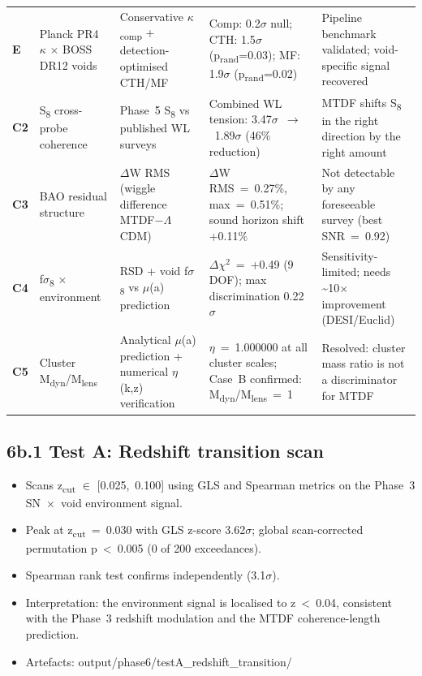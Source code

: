 \documentclass[11pt,a4paper]{article}
\begin{document}
\begin{table}[H]
\begin{tabularx}{\linewidth}{l>{\RaggedRight\arraybackslash}X>{\RaggedRight\arraybackslash}X>{\RaggedRight\arraybackslash}X>{\RaggedRight\arraybackslash}X}
\textbf{E} & Planck PR4 $\kappa$ $\times$ BOSS DR12 voids & Conservative $\kappa$\textsubscript{comp} + detection-optimised CTH/\allowbreak{}MF & Comp: 0.2$\sigma$ null; CTH: 1.5$\sigma$ (p\textsubscript{rand}=0.03); MF: 1.9$\sigma$ (p\textsubscript{rand}=0.02) & Pipeline benchmark validated; void-specific signal recovered \tabularnewline
\textbf{C2} & S\textsubscript{8} cross-probe coherence & Phase~5 S\textsubscript{8} vs published WL surveys & Combined WL tension: 3.47$\sigma$~$\rightarrow$~1.89$\sigma$ (46\% reduction) & MTDF shifts S\textsubscript{8} in the right direction by the right amount \tabularnewline
\textbf{C3} & BAO residual structure & $\Delta$W RMS (wiggle difference MTDF$-$$\Lambda$CDM) & $\Delta$W RMS~=~0.27\%, max~=~0.51\%; sound horizon shift +0.11\% & Not detectable by any foreseeable survey (best SNR~=~0.92) \tabularnewline
\textbf{C4} & f$\sigma$\textsubscript{8} $\times$ environment & RSD + void f$\sigma$\textsubscript{8} vs $\mu$(a) prediction & $\Delta$$\chi$$^{2}$~=~+0.49 (9 DOF); max discrimination 0.22$\sigma$ & Sensitivity-limited; needs \~{}10$\times$ improvement (DESI/\allowbreak{}Euclid) \tabularnewline
\textbf{C5} & Cluster M\textsubscript{dyn}/M\textsubscript{lens} & Analytical $\mu$(a) prediction + numerical $\eta$(k,z) verification & $\eta$~=~1.000000 at all cluster scales; Case~B confirmed: M\textsubscript{dyn}/M\textsubscript{lens}~=~1 & Resolved: cluster mass ratio is not a discriminator for MTDF \tabularnewline
\bottomrule
\end{tabularx}
\end{table}

\subsection{6b.1 Test A: Redshift transition scan}
\begin{itemize}
  \item Scans z\textsubscript{cut} $\in$ [0.025,~0.100] using GLS and Spearman metrics on the Phase~3 SN~$\times$~void environment signal.
  \item Peak at z\textsubscript{cut}~=~0.030 with GLS z-score 3.62$\sigma$; global scan-corrected permutation p~<~0.005 (0 of 200 exceedances).
  \item Spearman rank test confirms independently (3.1$\sigma$).
  \item Interpretation: the environment signal is localised to z~<~0.04, consistent with the Phase~3 redshift modulation and the MTDF coherence-length prediction.
  \item Artefacts: output/\allowbreak{}phase6/\allowbreak{}testA\_\allowbreak{}redshift\_\allowbreak{}transition/\allowbreak{}
\end{itemize}
\end{document}
